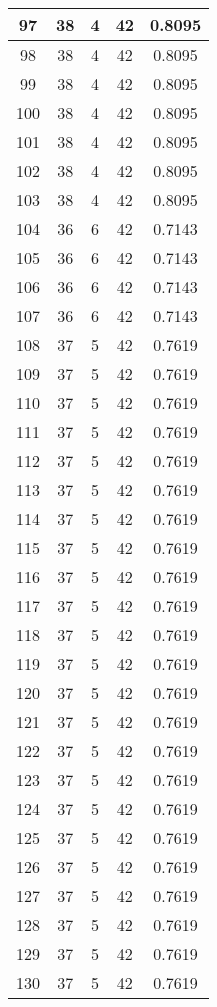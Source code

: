 \documentclass[letterpaper, 12pt]{article}
\begin{document}
\begin{longtable}{|c|c|c|c|c|}
\hline
97 & 38 & 4 & 42 & 0.8095 \\
\hline
98 & 38 & 4 & 42 & 0.8095 \\
\hline
99 & 38 & 4 & 42 & 0.8095 \\
\hline
100 & 38 & 4 & 42 & 0.8095 \\
\hline
101 & 38 & 4 & 42 & 0.8095 \\
\hline
102 & 38 & 4 & 42 & 0.8095 \\
\hline
103 & 38 & 4 & 42 & 0.8095 \\
\hline
104 & 36 & 6 & 42 & 0.7143 \\
\hline
105 & 36 & 6 & 42 & 0.7143 \\
\hline
106 & 36 & 6 & 42 & 0.7143 \\
\hline
107 & 36 & 6 & 42 & 0.7143 \\
\hline
108 & 37 & 5 & 42 & 0.7619 \\
\hline
109 & 37 & 5 & 42 & 0.7619 \\
\hline
110 & 37 & 5 & 42 & 0.7619 \\
\hline
111 & 37 & 5 & 42 & 0.7619 \\
\hline
112 & 37 & 5 & 42 & 0.7619 \\
\hline
113 & 37 & 5 & 42 & 0.7619 \\
\hline
114 & 37 & 5 & 42 & 0.7619 \\
\hline
115 & 37 & 5 & 42 & 0.7619 \\
\hline
116 & 37 & 5 & 42 & 0.7619 \\
\hline
117 & 37 & 5 & 42 & 0.7619 \\
\hline
118 & 37 & 5 & 42 & 0.7619 \\
\hline
119 & 37 & 5 & 42 & 0.7619 \\
\hline
120 & 37 & 5 & 42 & 0.7619 \\
\hline
121 & 37 & 5 & 42 & 0.7619 \\
\hline
122 & 37 & 5 & 42 & 0.7619 \\
\hline
123 & 37 & 5 & 42 & 0.7619 \\
\hline
124 & 37 & 5 & 42 & 0.7619 \\
\hline
125 & 37 & 5 & 42 & 0.7619 \\
\hline
126 & 37 & 5 & 42 & 0.7619 \\
\hline
127 & 37 & 5 & 42 & 0.7619 \\
\hline
128 & 37 & 5 & 42 & 0.7619 \\
\hline
129 & 37 & 5 & 42 & 0.7619 \\
\hline
130 & 37 & 5 & 42 & 0.7619 \\

\end{longtable}
\end{document}
